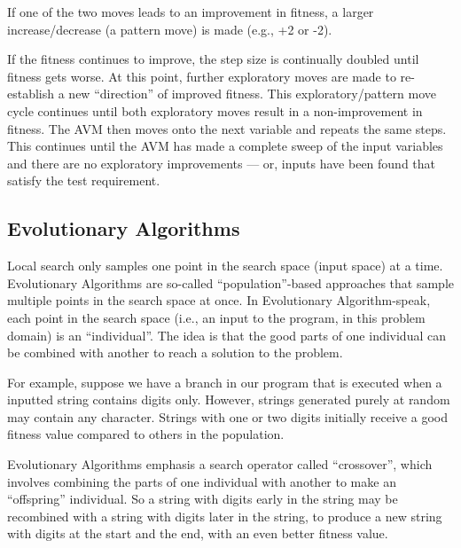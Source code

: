 
If one of the two moves leads to an improvement in fitness, a larger
increase/decrease (a pattern move) is made (e.g., +2 or -2). 




If the fitness continues to improve, the step size is continually doubled until
fitness gets worse. At this point, further exploratory moves are made to
re-establish a new ``direction'' of improved fitness. This exploratory/pattern
move cycle continues until both exploratory moves result in a non-improvement in
fitness. The AVM then moves onto the next variable and repeats the same steps.
This continues until the AVM has made a complete sweep of the input variables
and there are no exploratory improvements --- or, inputs have been found that
satisfy the test requirement.


\subsection{Evolutionary Algorithms}

Local search only samples one point in the search space (input space) at a time.
Evolutionary Algorithms are so-called ``population''-based approaches that
sample multiple points in the search space at once. In Evolutionary
Algorithm-speak, each point in the search space (i.e., an input to the program,
in this problem domain) is an ``individual''. The idea is that the good parts of
one individual can be combined with another to reach a solution to the problem. 


For example, suppose we have a branch in our program that is executed when a
inputted string contains digits only. However, strings generated purely at
random may contain any character. Strings with one or two digits initially
receive a good fitness value compared to others in the population. 


Evolutionary Algorithms emphasis a search operator called ``crossover'', which
involves combining the parts of one individual with another to make an
``offspring'' individual. So a string with digits early in the string may be
recombined with a string with digits later in the string, to produce a new
string with digits at the start and the end, with an even better fitness value. 

